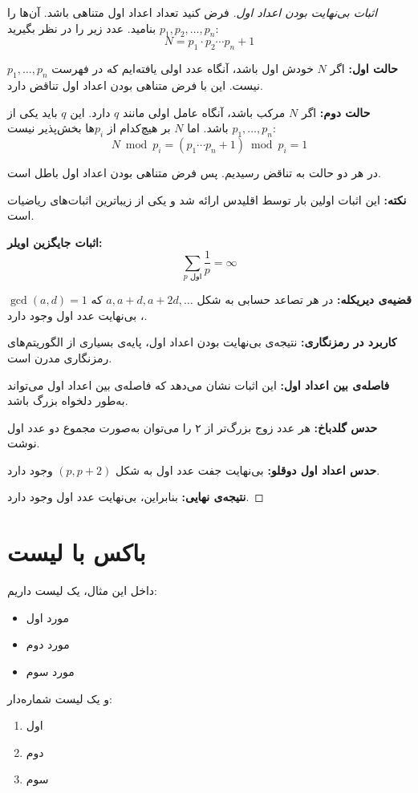 \documentclass{matinbook}
\begin{document}
\begin{proof}[اثبات بی‌نهایت بودن اعداد اول]
    فرض کنید تعداد اعداد اول متناهی باشد. آن‌ها را
    $p_1, p_2, \ldots, p_n$ بنامید. عدد زیر را در نظر بگیرید:
    \[
    N = p_1 \cdot p_2 \cdots p_n + 1
    \]

    \textbf{حالت اول:} اگر $N$ خودش اول باشد، آنگاه عدد
    اولی یافته‌ایم که در فهرست $p_1, \ldots, p_n$ نیست.
    این با فرض متناهی بودن اعداد اول تناقض دارد.

    \textbf{حالت دوم:} اگر $N$ مرکب باشد، آنگاه عامل اولی
    مانند $q$ دارد. این $q$ باید یکی از $p_1, \ldots, p_n$
    باشد. اما $N$ بر هیچ‌کدام از $p_i$ها بخش‌پذیر نیست:
    \[
    N \bmod p_i = (p_1 \cdots p_n + 1) \bmod p_i = 1
    \]

    در هر دو حالت به تناقض رسیدیم. پس فرض متناهی بودن
    اعداد اول باطل است.

    \textbf{نکته:} این اثبات اولین بار توسط اقلیدس ارائه شد
    و یکی از زیباترین اثبات‌های ریاضیات است.

    \textbf{اثبات جایگزین اویلر:}
    \[
    \sum_{p \text{ اول}} \frac{1}{p} = \infty
    \]

    \textbf{قضیه‌ی دیریکله:} در هر تصاعد حسابی به شکل
    $a, a+d, a+2d, \ldots$ که $\gcd(a, d) = 1$،
    بی‌نهایت عدد اول وجود دارد.

    \textbf{کاربرد در رمزنگاری:} نتیجه‌ی بی‌نهایت بودن
    اعداد اول، پایه‌ی بسیاری از الگوریتم‌های رمزنگاری
    مدرن است.

    \textbf{فاصله‌ی بین اعداد اول:} این اثبات نشان می‌دهد
    که فاصله‌ی بین اعداد اول می‌تواند به‌طور دلخواه بزرگ
    باشد.

    \textbf{حدس گلدباخ:} هر عدد زوج بزرگ‌تر از ۲ را می‌توان
    به‌صورت مجموع دو عدد اول نوشت.

    \textbf{حدس اعداد اول دوقلو:} بی‌نهایت جفت عدد اول
    به شکل $(p, p+2)$ وجود دارد.

    \textbf{نتیجه‌ی نهایی:} بنابراین، بی‌نهایت عدد اول
    وجود دارد.
\end{proof}

\section{باکس با لیست}
\label{sec:boxes-with-lists}

\begin{example}
    داخل این مثال، یک لیست داریم:
    \begin{itemize}
        \item مورد اول
        \item مورد دوم
        \item مورد سوم
    \end{itemize}
    و یک لیست شماره‌دار:
    \begin{enumerate}
        \item اول
        \item دوم
        \item سوم
    \end{enumerate}
\end{example}
\end{document}
